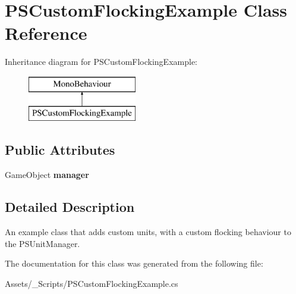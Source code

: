\hypertarget{class_p_s_custom_flocking_example}{}\section{P\+S\+Custom\+Flocking\+Example Class Reference}
\label{class_p_s_custom_flocking_example}
Inheritance diagram for P\+S\+Custom\+Flocking\+Example\+:\begin{figure}[H]
\begin{center}
\leavevmode
\includegraphics[height=2.000000cm]{class_p_s_custom_flocking_example}
\end{center}
\end{figure}
\subsection*{Public Attributes}
\begin{DoxyCompactItemize}
\item 
\mbox{\label{class_p_s_custom_flocking_example_a2665ff1dc3ea0767286671e4f9a8a2cc}} 
Game\+Object {\bfseries manager}
\end{DoxyCompactItemize}


\subsection{Detailed Description}
An example class that adds custom units, with a custom flocking behaviour to the P\+S\+Unit\+Manager. 

The documentation for this class was generated from the following file\+:\begin{DoxyCompactItemize}
\item 
Assets/\+\_\+\+Scripts/P\+S\+Custom\+Flocking\+Example.\+cs\end{DoxyCompactItemize}
